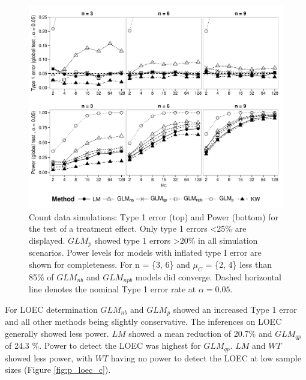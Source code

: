 \documentclass[twocolumn, natbib]{svjour3}
\begin{document}
\begin{figure}
  \centering
  \includegraphics[width = 129mm]{p_glob_c.pdf}
  \caption{Count data simulations: Type 1 error (top) and Power (bottom) for the test of a treatment effect.
  Only type 1 errors \textless 25\% are displayed. 
  $GLM_p$ showed type 1 errors \textgreater 20\% in all simulation scenarios.
  Power levels for models with inflated type I error are shown for completeness.
  For n = \{3, 6\} and $\mu_C$ = \{2, 4\} less than 85\% of $GLM_{nb}$ and $GLM_{npb}$ models did converge.
  Dashed horizontal line denotes the nominal Type 1 error rate at $\alpha = 0.05$.
  }
  \label{fig:p_glob_c}
\end{figure}

For LOEC determination $GLM_{nb}$ and $GLM_{p}$ showed an increased Type 1 error and all other methods being slightly conservative.
The inferences on LOEC generally showed less power.
$LM$ showed a mean reduction of 20.7\% and $GLM_{qp}$ of 24.3 \%.
Power to detect the LOEC was highest for $GLM_{qp}$. 
$LM$ and $WT$ showed less power, with $WT$ having no power to detect the LOEC at low sample sizes (Figure \ref{fig:p_loec_c}).
\end{document}
